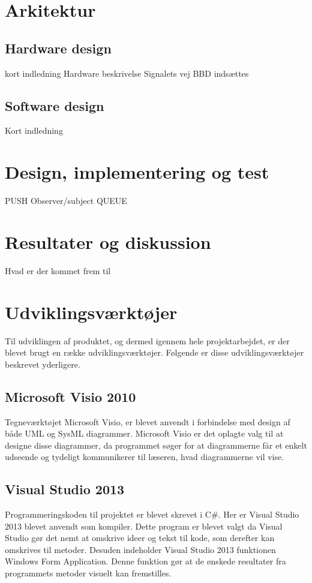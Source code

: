 	\section{Arkitektur}
	\subsection{Hardware design}
	kort indledning
	Hardware beskrivelse
	Signalets vej
	BBD indsættes
	\subsection{Software design}
	Kort indledning
	\section{Design, implementering og test}
	PUSH
	Observer/subject
	QUEUE
	
	
	
	
\section{Resultater og diskussion}
Hvad er der kommet frem til
\section{Udviklingsværktøjer}
Til udviklingen af produktet, og dermed igennem hele projektarbejdet, er der blevet brugt en række udviklingsværktøjer. Følgende er disse udviklingsværktøjer beskrevet yderligere.
\subsection{Microsoft Visio 2010}
Tegneværktøjet Microsoft Visio, er blevet anvendt i forbindelse med design af både UML og SysML diagrammer. Microsoft Visio er det oplagte valg til at designe disse diagrammer, da programmet søger for at diagrammerne får et enkelt udseende og tydeligt kommunikerer til læseren, hvad diagrammerne vil vise.
\subsection{Visual Studio 2013}
Programmeringskoden til projektet er blevet skrevet i C\#. Her er Visual Studio 2013 blevet anvendt som kompiler. Dette program er blevet valgt da Visual Studio gør det nemt at omskrive ideer og tekst til kode, som derefter kan omskrives til metoder. Desuden indeholder Visual Studio 2013 funktionen Windows Form Application. Denne funktion gør at de ønskede resultater fra programmets metoder visuelt kan fremstilles.
